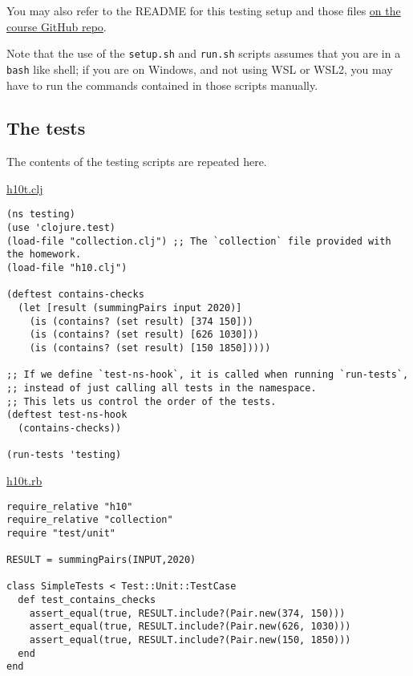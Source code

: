 \documentclass[11pt]{article}
\begin{document}
You may also refer to the README
for this testing setup and those files
\href{https://github.com/armkeh/principles-of-programming-languages/tree/master/homework/testing/h10}{on the course GitHub repo}.

Note that the use of the \texttt{setup.sh} and \texttt{run.sh} scripts assumes
that you are in a \texttt{bash} like shell; if you are on Windows,
and not using WSL or WSL2, you may have
to run the commands contained in those scripts manually.

\subsection*{The tests}
\label{sec:org3abc8d0}
The contents of the testing scripts are repeated here.

\href{./testing/h10/h10t.clj}{h10t.clj}
\begin{verbatim}
(ns testing)
(use 'clojure.test)
(load-file "collection.clj") ;; The `collection` file provided with the homework.
(load-file "h10.clj")

(deftest contains-checks
  (let [result (summingPairs input 2020)]
    (is (contains? (set result) [374 150]))
    (is (contains? (set result) [626 1030]))
    (is (contains? (set result) [150 1850]))))

;; If we define `test-ns-hook`, it is called when running `run-tests`,
;; instead of just calling all tests in the namespace.
;; This lets us control the order of the tests.
(deftest test-ns-hook
  (contains-checks))

(run-tests 'testing)
\end{verbatim}

\href{./testing/h10/h10t.rb}{h10t.rb}
\begin{verbatim}
require_relative "h10"
require_relative "collection"
require "test/unit"

RESULT = summingPairs(INPUT,2020)

class SimpleTests < Test::Unit::TestCase
  def test_contains_checks
    assert_equal(true, RESULT.include?(Pair.new(374, 150)))
    assert_equal(true, RESULT.include?(Pair.new(626, 1030)))
    assert_equal(true, RESULT.include?(Pair.new(150, 1850)))
  end
end
\end{verbatim}
\end{document}
